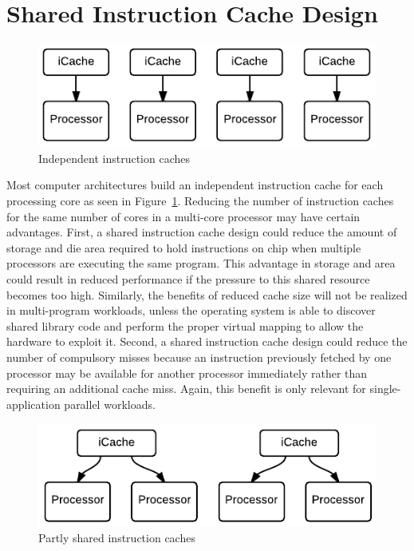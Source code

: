 \section{Shared Instruction Cache Design}


\begin{figure}[ht!]
\centering
\includegraphics[width=\columnwidth]{graphics/IndependentCaches}
\caption{Independent instruction caches}
\label{fig:indep}
\end{figure}

Most computer architectures build an independent instruction cache for
each processing core as seen in Figure~\ref{fig:indep}.
Reducing the number of instruction caches for the same number of cores
in a multi-core processor may have certain advantages. 
First, a shared instruction cache design could reduce the amount of
storage and die area required to hold instructions on chip when
multiple processors are executing the same program.
This advantage in storage and area could result in reduced performance
if the pressure to this shared resource becomes too high.
Similarly, the benefits of reduced cache size will not be realized in
multi-program workloads, unless the operating system is able to
discover shared library code and perform the proper virtual mapping to
allow the hardware to exploit it.
Second, a shared instruction cache design could reduce the number of
compulsory misses because an instruction previously fetched
by one processor may be available for another processor immediately
rather than requiring an additional cache miss. 
Again, this benefit is only relevant for single-application parallel
workloads. 

\begin{figure}[ht!]
\centering
\includegraphics[width=\columnwidth]{graphics/PairedCaches}
\caption{Partly shared instruction caches}
\label{fig:paired}
\end{figure}

